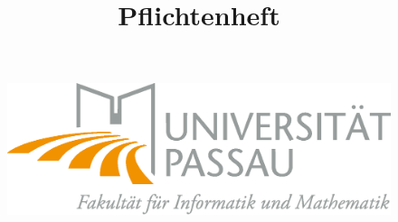 \documentclass[10pt]{scrreprt}
\begin{document}
\thispagestyle{empty}
\sffamily
 
\title{Pflichtenheft}

\begin{figure}
	\begin{flushright}
		\includegraphics[scale=0.4]{uniLogo.eps}
		\vspace{2.0 cm}
	\end{flushright}
\end{figure}
\end{document}
